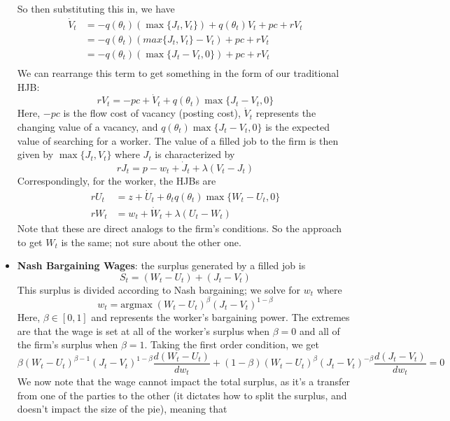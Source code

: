 \documentclass[12pt]{article}
\begin{document}
\begin{itemize}
    So then substituting this in, we have
    \[\begin{split}
        \dot{V}_t &= -q(\theta_t)\left(\max \{J_t, V_t\}\right) +q(\theta_t)V_t +pc+ rV_t \\
        &= -q(\theta_t)\left(max \{J_t, V_t\} - V_t\right) +pc+ rV_t \\
        &= -q(\theta_t)\left(\max \{J_t-V_t, 0\}\right) +pc+ rV_t \\
    \end{split}\]
    We can rearrange this term to get something in the form of our traditional HJB:
    \begin{equation}\label{V HJB}
        rV_t = -pc + \dot{V}_t + q(\theta_t)\max\{J_t-V_t, 0\}
    \end{equation}
    Here, $-pc$ is the flow cost of vacancy (posting cost), $\dot{V}_t$ represents the changing value of a vacancy, and $q(\theta_t)\max\{J_t-V_t,0\}$ is the expected value of searching for a worker. The value of a filled job to the firm is then given by $\max\{J_t,V_t\}$ where $J_t$ is characterized by
    \begin{equation}\label{J HJB}
        rJ_t = p - w_t + \dot{J}_t + \lambda (V_t -J_t)
    \end{equation}
    Correspondingly, for the worker, the HJBs are 
    \[\begin{split}
        rU_t &= z + \dot{U}_t + \theta_tq(\theta_t)\max\{W_t-U_t,0\} \\
        rW_t &= w_t + \dot{W}_t + \lambda (U_t - W_t)
    \end{split}\]
    Note that these are direct analogs to the firm's conditions. So the approach to get $W_t$ is the same; not sure about the other one.
    \item \textbf{Nash Bargaining Wages}: the surplus generated by a filled job is
    \[S_t = (W_t - U_t) + (J_t - V_t)\]
    This surplus is divided according to Nash bargaining; we solve for $w_t$ where 
    \[w_t = \text{argmax}\; (W_t - U_t)^{\beta}(J_t - V_t)^{1-\beta}\]
    Here, $\beta \in [0,1]$ and represents the worker's bargaining power. The extremes are that the wage is set at all of the worker's surplus when $\beta = 0$ and all of the firm's surplus when $\beta = 1$. Taking the first order condition, we get
    \[\beta(W_t-U_t)^{\beta-1}(J_t - V_t)^{1-\beta}\frac{d(W_t-U_t)}{dw_t} + (1-\beta)(W_t-U_t)^{\beta}(J_t - V_t)^{-\beta}\frac{d(J_t-V_t)}{dw_t} = 0\]
    We now note that the wage cannot impact the total surplus, as it's a transfer from one of the parties to the other (it dictates how to split the surplus, and doesn't impact the size of the pie), meaning that

\end{itemize}
\end{document}
